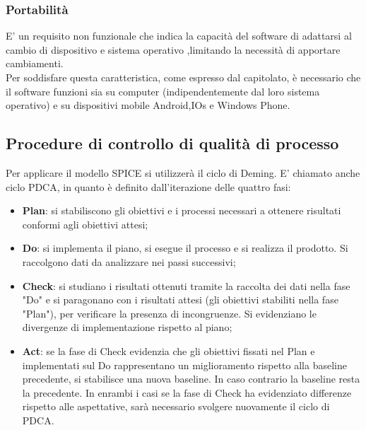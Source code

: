 \subsubsection{Portabilità}

E' un requisito non funzionale che indica la capacità del software di adattarsi al cambio di dispositivo e sistema operativo ,limitando la necessità di apportare cambiamenti.\\
Per soddisfare questa caratteristica, come espresso dal capitolato, è necessario che il software funzioni sia su computer (indipendentemente dal loro sistema operativo) e su dispositivi mobile Android,IOs e Windows Phone.

\subsection{Procedure di controllo di qualità di processo}
Per applicare il modello SPICE si utilizzerà il ciclo di Deming. E' chiamato anche ciclo PDCA, in quanto è definito dall'iterazione delle quattro fasi:
\begin{itemize}
\item 
\textbf{Plan}:
si stabiliscono gli obiettivi e i processi necessari a ottenere risultati conformi agli obiettivi attesi;
\item 
\textbf{Do}:
si implementa il piano, si esegue il processo e si realizza il prodotto. Si raccolgono dati da analizzare nei passi successivi;
\item
\textbf{Check}:
si studiano i risultati ottenuti tramite la raccolta dei dati nella fase "Do" e si paragonano con i risultati attesi (gli obiettivi stabiliti nella fase "Plan"), per verificare la presenza di incongruenze. Si evidenziano le divergenze di implementazione rispetto al piano;
\item 
\textbf{Act}:
se la fase di Check evidenzia che gli obiettivi fissati nel Plan e implementati sul Do rappresentano un miglioramento rispetto alla baseline precedente, si stabilisce una nuova baseline. In caso contrario la baseline resta la precedente. In enrambi i casi se la fase di Check ha evidenziato differenze rispetto alle aspettative, sarà necessario svolgere nuovamente il ciclo di PDCA.
\end{itemize}